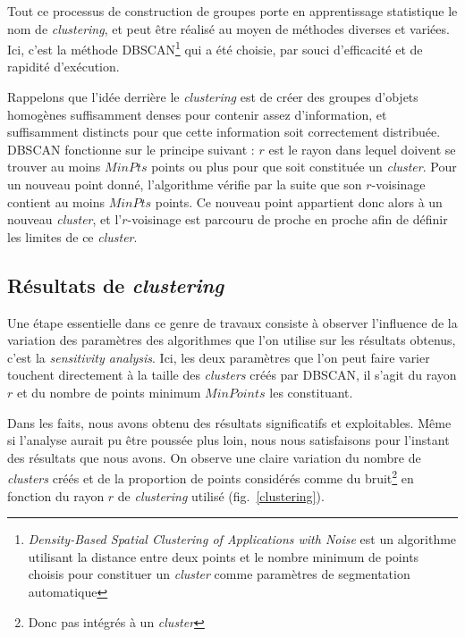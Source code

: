 \documentclass[11pt, a4paper]{article}
\begin{document}
Tout ce processus de construction de groupes porte en apprentissage statistique le nom de \textit{clustering}, et peut être réalisé au moyen de méthodes diverses et variées. Ici, c'est la méthode DBSCAN\footnote{\textit{Density-Based Spatial Clustering of Applications with Noise} est un algorithme utilisant la distance entre deux points et le nombre minimum de points choisis pour constituer un \textit{cluster} comme paramètres de segmentation automatique} qui a été choisie, par souci d'efficacité et de rapidité d'exécution.

Rappelons que l'idée derrière le \textit{clustering} est de créer des groupes d'objets homogènes suffisamment denses pour contenir assez d'information, et suffisamment distincts pour que cette information soit correctement distribuée. DBSCAN fonctionne sur le principe suivant : $r$ est le rayon dans lequel doivent se trouver au moins $MinPts$ points ou plus pour que soit constituée un \textit{cluster}. Pour un nouveau point donné, l'algorithme vérifie par la suite que son $r$-voisinage contient au moins $MinPts$ points. Ce nouveau point appartient donc alors à un nouveau \textit{cluster}, et l'$r$-voisinage est parcouru de proche en proche afin de définir les limites de ce \textit{cluster}.

\subsection{Résultats de \textit{clustering}}

Une étape essentielle dans ce genre de travaux consiste à observer l'influence de la variation des paramètres des algorithmes que l'on utilise sur les résultats obtenus, c'est la \textit{sensitivity analysis}. Ici, les deux paramètres que l'on peut faire varier touchent directement à la taille des \textit{clusters} créés par DBSCAN, il s'agit du rayon $r$ et du nombre de points minimum $MinPoints$ les constituant.

Dans les faits, nous avons obtenu des résultats significatifs et exploitables. Même si l'analyse aurait pu être poussée plus loin, nous nous satisfaisons pour l'instant des résultats que nous avons. On observe une claire variation du nombre de \textit{clusters} créés et de la proportion de points considérés comme du bruit\footnote{Donc pas intégrés à un \textit{cluster}} en fonction du rayon $r$ de \textit{clustering} utilisé (fig.~\ref{clustering}).
\end{document}
